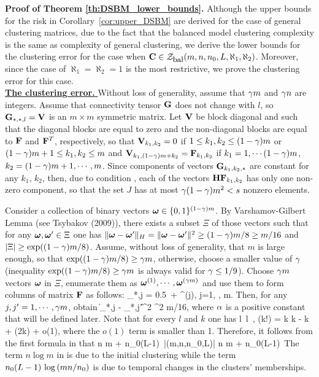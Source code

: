 \noindent
{\bf Proof of Theorem \ref{th:DSBM_lower_bounds}. }
Although the upper bounds for the risk in Corollary~\ref{cor:upper_DSBM}
are derived for the case of general clustering matrices, due to the fact that the balanced model clustering complexity
is the same as complexity of general clustering, we derive the lower bounds for the clustering error for the case 
when $\mathbf{C} \in  {\cal{Z}}_{\mbox{\small bal}} (m,n,n_0,L,\aleph_1, \aleph_2)$. Moreover, since the case of $\aleph_1 = \aleph_2 =1$
is the most restrictive, we prove the clustering error for this case.
\\
 

\underline{\bf The clustering error. } 
Without loss of generality, assume that   $\gamma m$ and $\gamma n$ are integers.  
Assume that connectivity tensor $\mathbf{G}$ does not change with $l$, so   $\mathbf{G}_{*,*,l} = \mathbf{V}$ is an $m\times m$ symmetric matrix.
Let $\mathbf{V}$ be block diagonal and  such that the diagonal blocks are equal to zero
and the non-diagonal blocks are equal to $\mathbf{F}$ and $\mathbf{F}^T$, respectively, so that
$\mathbf{V}_{k_1,k_2} =0$ if $1 \leq k_1,k_2 \leq (1-\gamma)m$ or 
$(1-\gamma)m+1 \leq k_1,k_2 \leq m$ and  
$\mathbf{V}_{k_1,(1-\gamma)m +k_2}  = \mathbf{F}_{k_1,k_2}$ if  $k_1 = 1 ,\cdots (1-\gamma)m$, $k_2= (1-\gamma)m+1, \cdots,   m$. 
Since components of vectors $\mathbf{G}_{k_1, k_2, *}$ are constant for any $k_1$, $k_2$, then,
due to condition , each of the vectors $\mathbf{H} \mathbf{F}_{k_1, k_2}$ has only one non-zero component, 
so that  the set $J$ has at most $\gamma(1-\gamma)m^2 < s$ nonzero elements.



Consider a collection of binary vectors $\bom \in \{0,1\}^{(1-\ga)m}$.
By Varshamov-Gilbert Lemma (see Tsybakov (2009)), there exists a subset $\Xi$ of those vectors 
such that for any $\bom, \bom' \in \Xi$ one has 
$\|\bom - \bom'\|_H = \|\bom - \bom'\|^2 \geq (1 - \ga)m/8 \geq m/16$
and $|\Xi| \geq \exp((1-\gamma)m/8)$. 
Assume, without loss of generality, that $m$ is large enough, so that 
$\exp((1-\gamma)m/8) \geq \gamma m$, otherwise, choose a smaller value of $\gamma$ 
(inequality $\exp((1-\gamma)m/8) \geq \gamma m$ is always valid for $\gamma \leq 1/9$).
Choose $\gamma m$ vectors $\bom$ in $\Xi$, enumerate them as $\bom^{(1)}, \cdots, \bom^{(\ga m)}$
and use them to form columns of matrix $\mathbf{F}$ as follows:
\be \label{Fmatr}
\bF_{*,j} = 0.5\, \bone + \al \bom^{(j)}, \quad j=1, \cdots, \ga m.
\ee
Then, for any $j, j' = 1, \cdots, \gamma m$, obtain
\be \label{dist1}
\|\bF_{*,j} - \bF_{*,j'}\|^2 \geq \al^2   m/16,
\ee
where $\alpha$ is a positive constant that will be defined later.
%
%
Note that for every $l$ and $k$ one has 
\be \label{inequalities}
l\, \log\lkr {}\rkr \leq {} \leq l\, \log\lkr {}\rkr, \quad 
\log(k!) = k \log k - k +  \log(2\pi k) + o(1),
\ee
where the $o(1)$ term is smaller than 1. Therefore, it follows from the first formula in  that
\be \label{log_card}
n \log m + n_0(L-1)\, \log \lkr {} \rkr \leq 
\log|\calZ (m,n,n_0,L)| \leq  
n \log m + n_0(L-1)\, \log \lkr {} \rkr  
\ee
The term $n \log m$ in  is due to the initial clustering while the term 
$n_0(L-1)\, \log \left(  m n/n_0  \right)$ is due to temporal changes in the clusters' memberships.



